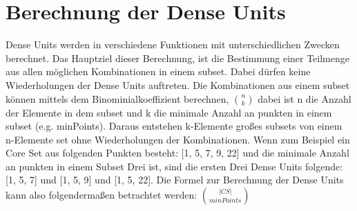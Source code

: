 \section{Berechnung der Dense Units}

Dense Units werden in verschiedene Funktionen mit unterschiedlichen Zwecken berechnet. Das Hauptziel dieser Berechnung, ist die Bestimmung einer Teilmenge aus allen möglichen Kombinationen in einem subset. Dabei dürfen keine Wiederholungen der Dense Units auftreten. Die Kombinationen aus einem subset können mittels dem Binominialkoeffizient berechnen, $ \binom{n}{k} $ dabei ist n die Anzahl der Elemente in dem subset und k die minimale Anzahl an punkten in einem subset (e.g. minPoints). Daraus entstehen k-Elemente großes subsets von einem n-Elemente set ohne Wiederholungen der Kombinationen.
Wenn zum Beispiel ein Core Set aus folgenden Punkten besteht: [1, 5, 7, 9, 22] und die minimale Anzahl an punkten in einem Subset Drei ist, sind die ersten Drei Dense Units folgende: [1, 5, 7] und [1, 5, 9] und [1, 5, 22]. Die Formel zur Berechnung der Dense Units kann also folgendermaßen betrachtet werden: 
$ \binom{|CS|}{minPoints}$